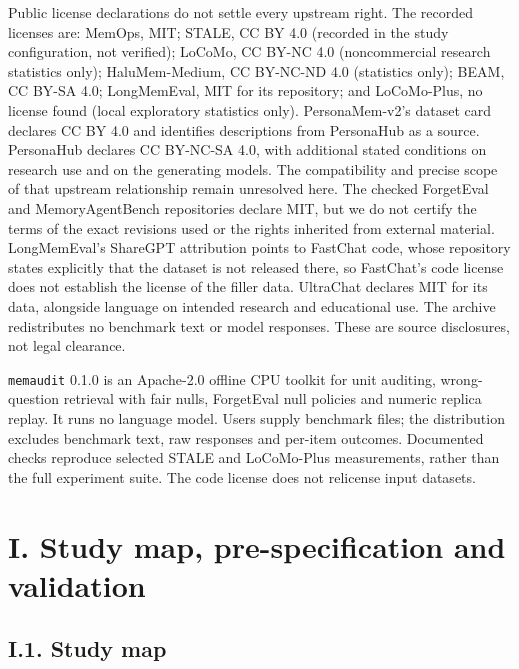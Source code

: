 \documentclass[11pt]{article}
\begin{document}
Public license declarations do not settle every upstream right. The recorded licenses are: MemOps, MIT; STALE, CC BY 4.0 (recorded in the study configuration, not verified); LoCoMo, CC BY-NC 4.0 (noncommercial research statistics only); HaluMem-Medium, CC BY-NC-ND 4.0 (statistics only); BEAM, CC BY-SA 4.0; LongMemEval, MIT for its repository; and LoCoMo-Plus, no license found (local exploratory statistics only). PersonaMem-v2's dataset card declares CC BY 4.0 and identifies descriptions from PersonaHub \citep{Ge2024PersonaHub} as a source. PersonaHub declares CC BY-NC-SA 4.0, with additional stated conditions on research use and on the generating models. The compatibility and precise scope of that upstream relationship remain unresolved here. The checked ForgetEval and MemoryAgentBench repositories declare MIT, but we do not certify the terms of the exact revisions used or the rights inherited from external material. LongMemEval's ShareGPT attribution points to FastChat code, whose repository states explicitly that the dataset is not released there, so FastChat's code license does not establish the license of the filler data. UltraChat \citep{Ding2023UltraChat} declares MIT for its data, alongside language on intended research and educational use. The archive redistributes no benchmark text or model responses. These are source disclosures, not legal clearance.

\nolinkurl{memaudit} 0.1.0 is an Apache-2.0 offline CPU toolkit for unit auditing, wrong-question retrieval with fair nulls, ForgetEval null policies and numeric replica replay. It runs no language model. Users supply benchmark files; the distribution excludes benchmark text, raw responses and per-item outcomes. Documented checks reproduce selected STALE and LoCoMo-Plus measurements, rather than the full experiment suite. The code license does not relicense input datasets.

\label{appendix-i}

\section{I. Study map, pre-specification and validation}\label{i.-study-map-pre-specification-and-validation}


\subsection{I.1. Study map}\label{i.1.-study-map}
\end{document}
